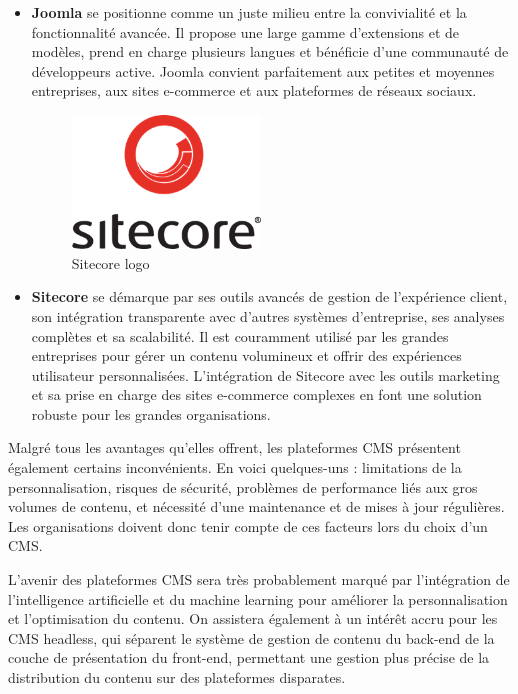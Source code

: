 \begin{itemize}
    \item \textbf{Joomla} se positionne comme un juste milieu entre la convivialité et la fonctionnalité avancée. Il propose une large gamme d'extensions et de modèles, prend en charge plusieurs langues et bénéficie d'une communauté de développeurs active. Joomla convient parfaitement aux petites et moyennes entreprises, aux sites e-commerce et aux plateformes de réseaux sociaux.

          \begin{figure}[H]
              \centering
              \includegraphics[width=5cm]{Figures/Sitecore.png}
              \caption{Sitecore logo }
              \label{fig:my_label} %
          \end{figure}


    \item \textbf{Sitecore} se démarque par ses outils avancés de gestion de l'expérience client, son intégration transparente avec d'autres systèmes d'entreprise, ses analyses complètes et sa scalabilité. Il est couramment utilisé par les grandes entreprises pour gérer un contenu volumineux et offrir des expériences utilisateur personnalisées. L'intégration de Sitecore avec les outils marketing et sa prise en charge des sites e-commerce complexes en font une solution robuste pour les grandes organisations.

\end{itemize}
\hspace{\parindent}Malgré tous les avantages qu'elles offrent, les plateformes CMS présentent également certains inconvénients. En voici quelques-uns : limitations de la personnalisation, risques de sécurité, problèmes de performance liés aux gros volumes de contenu, et nécessité d'une maintenance et de mises à jour régulières. Les organisations doivent donc tenir compte de ces facteurs lors du choix d'un CMS.

L'avenir des plateformes CMS sera très probablement marqué par l'intégration de l'intelligence artificielle et du machine learning pour améliorer la personnalisation et l'optimisation du contenu. On assistera également à un intérêt accru pour les CMS headless, qui séparent le système de gestion de contenu du back-end de la couche de présentation du front-end, permettant une gestion plus précise de la distribution du contenu sur des plateformes disparates.

